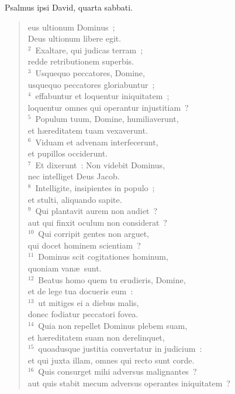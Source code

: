 \bchapter[Psalm]
Psalmus ipsi David, quarta sabbati. \begin{verse}eus ultionum Dominus~;\\ Deus ultionum libere egit.\\
${}^{2}$~Exaltare, qui judicas terram~;\\ redde retributionem superbis.\\
${}^{3}$~Usquequo peccatores, Domine,\\ usquequo peccatores gloriabuntur~;\\
${}^{4}$~effabuntur et loquentur iniquitatem~;\\ loquentur omnes qui operantur injustitiam~?\\
${}^{5}$~Populum tuum, Domine, humiliaverunt,\\ et h\ae reditatem tuam vexaverunt.\\
${}^{6}$~Viduam et advenam interfecerunt,\\ et pupillos occiderunt.\\
${}^{7}$~Et dixerunt~: Non videbit Dominus,\\ nec intelliget Deus Jacob.\\
${}^{8}$~Intelligite, insipientes in populo~;\\ et stulti, aliquando sapite.\\
${}^{9}$~Qui plantavit aurem non audiet~?\\ aut qui finxit oculum non considerat~?\\
${}^{10}$~Qui corripit gentes non arguet,\\ qui docet hominem scientiam~?\\
${}^{11}$~Dominus scit cogitationes hominum,\\ quoniam van\ae\ sunt.\\
${}^{12}$~Beatus homo quem tu erudieris, Domine,\\ et de lege tua docueris eum~:\\
${}^{13}$~ut mitiges ei a diebus malis,\\ donec fodiatur peccatori fovea.\\
${}^{14}$~Quia non repellet Dominus plebem suam,\\ et h\ae reditatem suam non derelinquet,\\
${}^{15}$~quoadusque justitia convertatur in judicium~:\\ et qui juxta illam, omnes qui recto sunt corde.\\
${}^{16}$~Quis consurget mihi adversus malignantes~?\\ aut quis stabit mecum adversus operantes iniquitatem~?\\

\end{verse}
